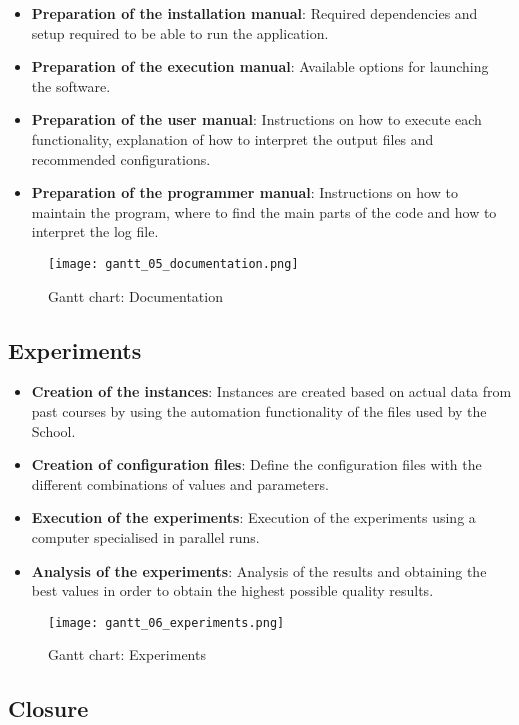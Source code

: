 \begin{itemize}
    \item \textbf{Preparation of the installation manual}: Required dependencies and setup required to be able to run the application.
    \item \textbf{Preparation of the execution manual}: Available options for launching the software.
    \item \textbf{Preparation of the user manual}: Instructions on how to execute each functionality, explanation of how to interpret the output files and recommended configurations.
    \item \textbf{Preparation of the programmer manual}: Instructions on how to maintain the program, where to find the main parts of the code and how to interpret the log file.
\end{itemize}

\begin{figure}[H]
    \caption{Gantt chart: Documentation}
  \centering
  \texttt{[image: gantt\_05\_documentation.png]}
\end{figure}


\subsection{Experiments}

\begin{itemize}
    \item \textbf{Creation of the instances}: Instances are created based on actual data from past courses by using the automation functionality of the files used by the School.
    \item \textbf{Creation of configuration files}: Define the configuration files with the different combinations of values and parameters.
    \item \textbf{Execution of the experiments}: Execution of the experiments using a computer specialised in parallel runs.
    \item \textbf{Analysis of the experiments}: Analysis of the results and obtaining the best values in order to obtain the highest possible quality results.
\end{itemize}

\begin{figure}[H]
    \caption{Gantt chart: Experiments}
  \centering
  \texttt{[image: gantt\_06\_experiments.png]}
\end{figure}


\subsection{Closure}

